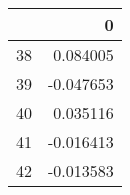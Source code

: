 \begin{tabular}{lr}
\toprule
{} &         0 \\
\midrule
38 &  0.084005 \\
39 & -0.047653 \\
40 &  0.035116 \\
41 & -0.016413 \\
42 & -0.013583 \\
\bottomrule
\end{tabular}

